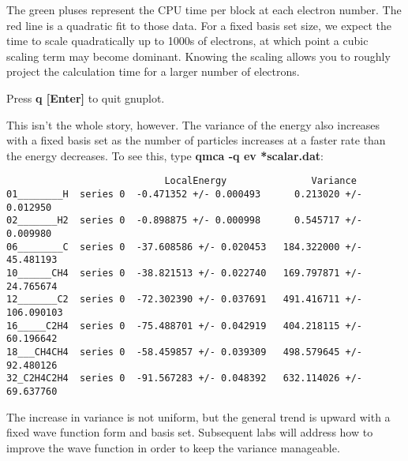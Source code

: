 
The green pluses represent the CPU time per block at each electron number.
The red line is a quadratic fit to those data.  For a fixed basis set size, we expect the time to scale quadratically up to 1000s of electrons, at which point a cubic scaling term may become dominant.  Knowing the scaling allows you to roughly project the calculation time for a larger number of electrons.

Press \textbf{q [Enter]} to quit gnuplot.

This isn't the whole story, however.  The variance of the energy also increases
with a fixed basis set as the number of particles increases at a faster rate
than the energy decreases.  To see this, type \textbf{qmca -q ev *scalar.dat}:

\begin{shaded}
\begin{verbatim}
                            LocalEnergy               Variance           
01________H  series 0  -0.471352 +/- 0.000493      0.213020 +/- 0.012950 
02_______H2  series 0  -0.898875 +/- 0.000998      0.545717 +/- 0.009980 
06________C  series 0  -37.608586 +/- 0.020453   184.322000 +/- 45.481193
10______CH4  series 0  -38.821513 +/- 0.022740   169.797871 +/- 24.765674
12_______C2  series 0  -72.302390 +/- 0.037691   491.416711 +/- 106.090103
16_____C2H4  series 0  -75.488701 +/- 0.042919   404.218115 +/- 60.196642
18___CH4CH4  series 0  -58.459857 +/- 0.039309   498.579645 +/- 92.480126
32_C2H4C2H4  series 0  -91.567283 +/- 0.048392   632.114026 +/- 69.637760
\end{verbatim}
\end{shaded}

The increase in variance is not uniform, but the general trend is upward with a
fixed wave function form and basis set.  Subsequent labs will address how to
improve the wave function in order to keep the variance manageable.
